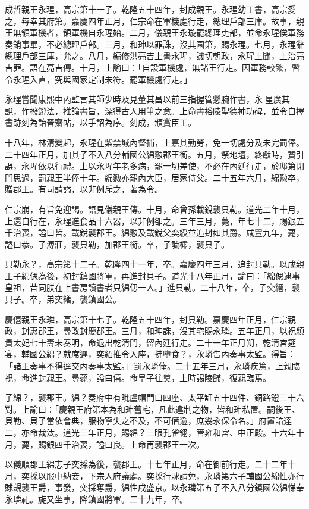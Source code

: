 \begin{pinyinscope}
成哲親王永瑆，高宗第十一子。乾隆五十四年，封成親王。永瑆幼工書，高宗愛之，每幸其府第。嘉慶四年正月，仁宗命在軍機處行走，總理戶部三庫。故事，親王無領軍機者，領軍機自永瑆始。二月，儀親王永璇罷總理吏部，並命永瑆俟軍務奏銷事畢，不必總理戶部。三月，和珅以罪誅，沒其園第，賜永瑆。七月，永瑆辭總理戶部三庫，允之。八月，編修洪亮吉上書永瑆，譏切朝政，永瑆上聞，上治亮吉罪。語在亮吉傳。十月，上諭曰：「自設軍機處，無諸王行走。因軍務較繁，暫令永瑆入直，究與國家定制未符。罷軍機處行走。」

永瑆嘗聞康熙中內監言其師少時及見董其昌以前三指握管懸腕作書，永星廣其說，作撥鐙法，推論書旨，深得古人用筆之意。上命書裕陵聖德神功碑，並令自擇書跡刻為詒晉齋帖，以手詔為序。刻成，頒賞臣工。

十八年，林清變起，永瑆在紫禁城內督捕，上嘉其勤勞，免一切處分及未完罰俸。二十四年正月，加其子不入八分輔國公綿懃郡王銜。五月，祭地壇，終獻時，贊引誤，永瑆依以行禮。上以永瑆年老多病，罷一切差使，不必在內廷行走，於邸第閉門思過，罰親王半俸十年。綿懃亦罷內大臣，居家侍父。二十五年六月，綿懃卒，贈郡王。有司請謚，以非例斥之，著為令。

仁宗崩，有旨免迎謁。語見儀親王傳。十月，命曾孫載銳襲貝勒。道光二年十月，上還自行在，永瑆進食品十六器，以非例卻之。三年三月，薨，年七十二，賜銀五千治喪，謚曰哲。載銳襲郡王。綿懃及載銳父奕綬並追封如其爵。咸豐九年，薨，謚曰恭。子溥莊，襲貝勒，加郡王銜。卒，子毓橚，襲貝子。

貝勒永？，高宗第十二子。乾隆四十一年，卒。嘉慶四年三月，追封貝勒。以成親王子綿偲為後，初封鎮國將軍，再進封貝子。道光十八年正月，諭曰：「綿偲逮事皇祖，昔同朕在上書房讀書者只綿偲一人。」進貝勒。二十八年，卒，子奕縉，襲貝子。卒，弟奕繕，襲鎮國公。

慶僖親王永璘，高宗第十七子。乾隆五十四年，封貝勒。嘉慶四年正月，仁宗親政，封惠郡王，尋改封慶郡王。三月，和珅誅，沒其宅賜永璘。五年正月，以祝穎貴太妃七十壽未奏明，命退出乾清門，留內廷行走。二十一年正月朔，乾清宮筵宴，輔國公綿？就席遲，奕紹推令入座，拂墮食？，永璘告內奏事太監。得旨：「諸王奏事不得逕交內奏事太監。」罰永璘俸。二十五年三月，永璘疾篤，上親臨視，命進封親王。尋薨，謚曰僖。命皇子往奠，上時謁陵歸，復親臨焉。

子綿？，襲郡王。綿？奏府中有毗盧帽門口四座、太平缸五十四件、銅路鐙三十六對。上諭曰：「慶親王府第本為和珅舊宅，凡此違制之物，皆和珅私置。嗣後王、貝勒、貝子當依會典，服物寧失之不及，不可僭逾，庶幾永保令名。」府置諳達二，亦命裁汰。道光三年正月，賜綿？三眼孔雀翎，管雍和宮、中正殿。十六年十月，薨，賜銀四千治喪，謚曰良。上命再襲郡王一次。

以儀順郡王綿志子奕採為後，襲郡王。十七年正月，命在御前行走。二十二年十月，奕採以服中納妾，下宗人府議處。奕採行賕請免，永璘第六子輔國公綿性亦行賕覬襲王爵，事發，奕採奪爵，綿性戍盛京。以永璘第五子不入八分鎮國公綿悌奉永璘祀。旋又坐事，降鎮國將軍。二十九年，卒。


\end{pinyinscope}
